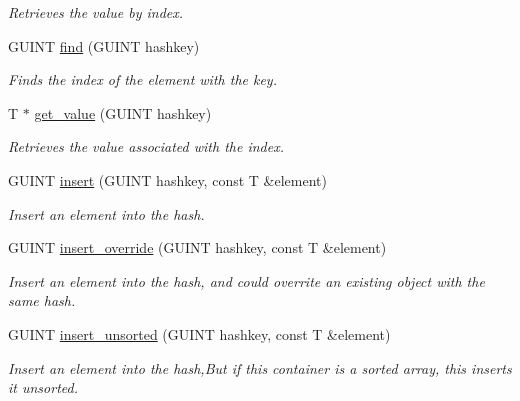 \begin{CompactItemize}
\begin{CompactList}\small\item\em Retrieves the value by index. \item\end{CompactList}\item 
GUINT \hyperlink{classgim__hash__table_14261b2d7de34188f8bc5179e4d60760}{find} (GUINT hashkey)
\begin{CompactList}\small\item\em Finds the index of the element with the key. \item\end{CompactList}\item 
T $\ast$ \hyperlink{classgim__hash__table_40b5c46a0117da3948cd1b093f185321}{get\_\-value} (GUINT hashkey)
\begin{CompactList}\small\item\em Retrieves the value associated with the index. \item\end{CompactList}\item 
GUINT \hyperlink{classgim__hash__table_ff0e9bdb5bd6aacf9272db6789c514f7}{insert} (GUINT hashkey, const T \&element)
\begin{CompactList}\small\item\em Insert an element into the hash. \item\end{CompactList}\item 
GUINT \hyperlink{classgim__hash__table_83987136757654921c71b183de8ec55e}{insert\_\-override} (GUINT hashkey, const T \&element)
\begin{CompactList}\small\item\em Insert an element into the hash, and could overrite an existing object with the same hash. \item\end{CompactList}\item 
\hypertarget{classgim__hash__table_be9a629ec7dfe612065ed9d161adc7e8}{
GUINT \hyperlink{classgim__hash__table_be9a629ec7dfe612065ed9d161adc7e8}{insert\_\-unsorted} (GUINT hashkey, const T \&element)}
\label{classgim__hash__table_be9a629ec7dfe612065ed9d161adc7e8}

\begin{CompactList}\small\item\em Insert an element into the hash,But if this container is a sorted array, this inserts it unsorted. \item\end{CompactList}\end{CompactItemize}
